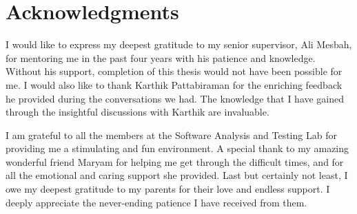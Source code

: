 
\chapter{Acknowledgments}
I would like to express my deepest gratitude to my senior supervisor, Ali Mesbah,
for mentoring me in the past four years with his patience and knowledge. Without his support, completion of this thesis would not have been possible for me.
I would also like to thank Karthik Pattabiraman for the enriching feedback he provided during the conversations we had. The knowledge that I have gained through the insightful
discussions with Karthik are invaluable.

I am grateful to all the members at the Software Analysis and Testing Lab for providing me a stimulating and fun environment. 
A special thank to my amazing wonderful friend Maryam for helping me get through the difficult times, and for all the emotional and caring support she provided.
Last but certainly not least, I owe my deepest gratitude to my
parents for their love and endless support. I deeply appreciate the never-ending patience I have received from them.


